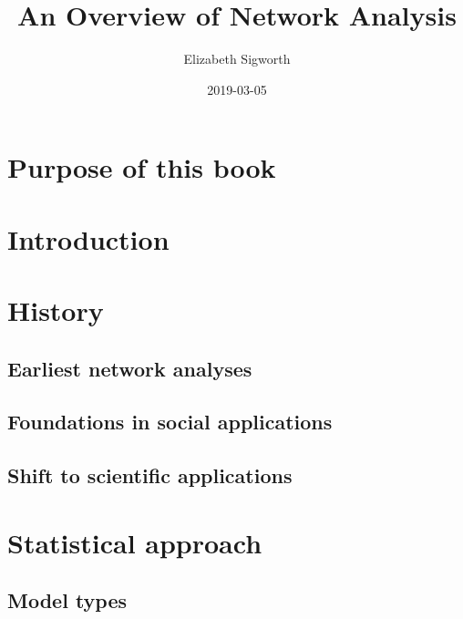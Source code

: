 \documentclass[]{book}
\title{An Overview of Network Analysis}
\author{Elizabeth Sigworth}
\date{2019-03-05}
\begin{document}
\maketitle

{
\setcounter{tocdepth}{1}
\tableofcontents
}
\chapter*{Purpose of this book}\label{purpose-of-this-book}

\chapter*{Introduction}\label{intro}

\chapter*{History}\label{history}

\section*{Earliest network analyses}\label{earliest-network-analyses}

\section*{Foundations in social
applications}\label{foundations-in-social-applications}

\section*{Shift to scientific
applications}\label{shift-to-scientific-applications}

\chapter*{Statistical approach}\label{statistical-approach}

\section*{Model types}\label{model-types}
\end{document}
